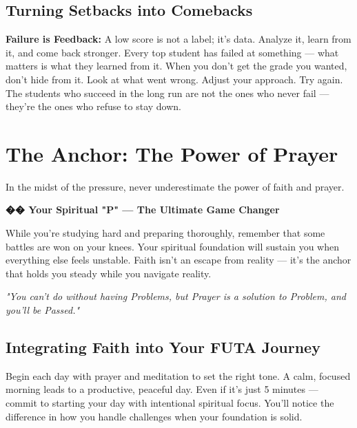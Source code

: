 \documentclass[11pt,a4paper]{article}
\newcommand{\quotetext}[1]{\begin{quotebox}\itshape\color{primary}#1\end{quotebox}}
\begin{document}
\subsection{Turning Setbacks into Comebacks}

\textbf{Failure is Feedback:} A low score is not a label; it's data. Analyze it, learn from it, and come back stronger. Every top student has failed at something --- what matters is what they learned from it. When you don't get the grade you wanted, don't hide from it. Look at what went wrong. Adjust your approach. Try again. The students who succeed in the long run are not the ones who never fail --- they're the ones who refuse to stay down.

\vspace{0.1cm}
\section{The Anchor: The Power of Prayer}

In the midst of the pressure, never underestimate the power of faith and prayer.

\begin{inspirational}
    \textbf{\color{primary}\Large �� Your Spiritual "P" --- The Ultimate Game Changer}

    \vspace{0.5em}

    While you're studying hard and preparing thoroughly, remember that some battles are won on your knees. Your spiritual foundation will sustain you when everything else feels unstable. Faith isn't an escape from reality --- it's the anchor that holds you steady while you navigate reality.

    \vspace{0.5em}

    \quotetext{"You can't do without having Problems, but Prayer is a solution to Problem, and you'll be Passed."}
\end{inspirational}

\subsection{Integrating Faith into Your FUTA Journey}

\begin{tcolorbox}[colback=lightGray,colframe=primary,title={\color{white}\textbf{Start Your Day Right}},colbacktitle=primary,arc=4pt,breakable]
Begin each day with prayer and meditation to set the right tone. A calm, focused morning leads to a productive, peaceful day. Even if it's just 5 minutes --- commit to starting your day with intentional spiritual focus. You'll notice the difference in how you handle challenges when your foundation is solid.
\end{tcolorbox}
\end{document}
